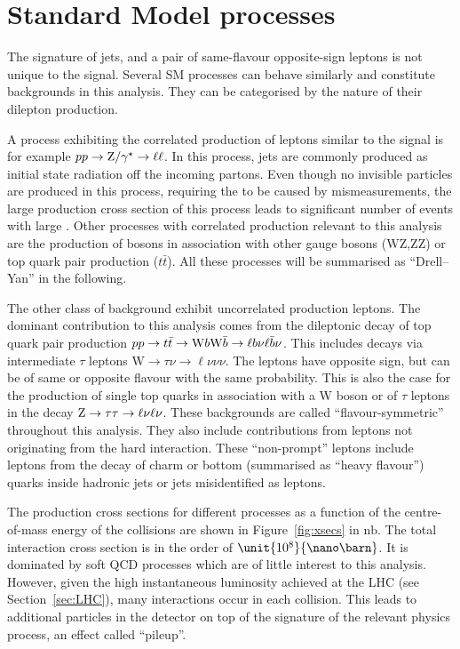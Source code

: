 \section{Standard Model processes}
\label{sec:SMBackgrounds}
The signature of jets, \MET and a pair of same-flavour opposite-sign leptons is not unique to the signal. Several SM processes can behave similarly and constitute backgrounds in this analysis. They can be categorised by the nature of their dilepton production. 

A process exhibiting the correlated production of leptons similar to the signal is for example $pp \rightarrow \mathrm{Z}/\gamma^{\star}\rightarrow \ell\ell$. In this process, jets are commonly produced as initial state radiation off the incoming partons. Even though no invisible particles are produced in this process, requiring the \MET to be caused by mismeasurements, the large production cross section of this process leads to significant number of events with large \MET. Other processes with correlated production relevant to this analysis are the production of \Z bosons in association with other gauge bosons ($\mathrm{WZ}$,$\mathrm{ZZ}$) or top quark pair production ($t\bar{t}$\Z). All these processes will be summarised as ``Drell--Yan'' in the following. 

The other class of background exhibit uncorrelated production leptons. The dominant contribution to this analysis comes from the dileptonic decay of top quark pair production $pp\rightarrow t\bar{t} \rightarrow \mathrm{W} b \mathrm{W} \bar{b}\rightarrow \ell b\nu \ell \bar{b} \nu$. This includes decays via intermediate $\tau$ leptons $\text{W}\rightarrow \tau \nu \rightarrow \ell \nu \nu \nu$. The leptons have opposite sign, but can be of same or opposite flavour with the same probability. This is also the case for the production of single top quarks in association with a W boson or of $\tau$ leptons in the decay $\mathrm{Z} \rightarrow \tau\tau \rightarrow \ell\nu\ell\nu$. These backgrounds are called ``flavour-symmetric'' throughout this analysis. They also include contributions from leptons not originating from the hard interaction. These ``non-prompt'' leptons include leptons from the decay of charm or bottom (summarised as ``heavy flavour'') quarks inside hadronic jets or jets misidentified as leptons.

The production cross sections for different processes as a function of the centre-of-mass energy of the collisions are shown in Figure~\ref{fig:xsecs} in $\mathrm{nb}$. The total interaction cross section is in the order of $\unit{10^{8}}{\nano\barn}$. It is dominated by soft QCD processes which are of little interest to this analysis. However, given the high instantaneous luminosity achieved at the LHC (see Section~\ref{sec:LHC}), many interactions occur in each collision. This leads to additional particles in the detector on top of the signature of the relevant physics process, an effect called ``pileup''.

